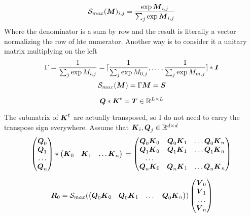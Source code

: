 \documentclass[journal]{IEEEtran}
\begin{document}
\begin{equation}
  \Smax{\Vc{M}}_{i,j}  = \Smaxd{\Vc{M}} 
\end{equation}
Where the denominator is a sum by row and the result is literally a
vector normalizing the row of hte numerator. Another way is to
consider it a unitary matrix multiplying on the left
\begin{equation}
  \label{eq:gamma}
  \Gamma= \frac{1}{\sum_j\exp{M_{i,j}}} = [ \frac{1}{\sum_j\exp{M_{0,j}}}, \dots,  \frac{1}{\sum_j\exp{M_{m,j}}} ] * \Vc{I}
\end{equation}
\begin{equation}
  \Smax{\Vc{M}}  = \Gamma \Vc{M} = \Vc{S}
\end{equation}

\begin{equation}
  {\boldsymbol Q}*{\boldsymbol K}^t = {\boldsymbol T} \in \mathbb{R}^{L\times L}
\end{equation}

The submatrix of ${\boldsymbol K}^t$ are actually transposed, so I do not need
to carry the transpose sign everywhere. Assume that ${\boldsymbol K}_i, {\boldsymbol Q}_j \in \mathbb{R}^{d\times d}$
{\small \begin{equation*}
  \label{eq:mat}
  \begin{pmatrix}
    \Vc{Q}_0  \\
    \Vc{Q}_1  \\
    \dots \\
    \Vc{Q}_n
  \end{pmatrix} * 
  \begin{pmatrix}
    \Vc{K}_0 & \Vc{K}_1  & \dots \Vc{K}_n \\
  \end{pmatrix}\\
  =
  \begin{pmatrix}
    \Vc{Q}_0\Vc{K}_0 & \Vc{Q}_0\Vc{K}_1  & \dots \Vc{Q}_0\Vc{K}_n \\
    \Vc{Q}_1\Vc{K}_0 & \Vc{Q}_1\Vc{K}_1  & \dots \Vc{Q}_1\Vc{K}_n \\
    \dots \\
    \Vc{Q}_n\Vc{K}_0 & \Vc{Q}_n\Vc{K}_1  & \dots \Vc{Q}_n\Vc{K}_n \\
  \end{pmatrix}\\
\end{equation*}
}

\begin{equation*}
  \Vc{R}_0 = \Smax{
    \begin{pmatrix}
      \Vc{Q}_0\Vc{K}_0 &  \Vc{Q}_0\Vc{K}_1  & \dots & \Vc{Q}_0\Vc{K}_n 
    \end{pmatrix}
  }
  \begin{pmatrix}
    \Vc{V}_0  \\
    \Vc{V}_1  \\
    \dots \\
    \Vc{V}_n
  \end{pmatrix} 
\end{equation*}
\end{document}
